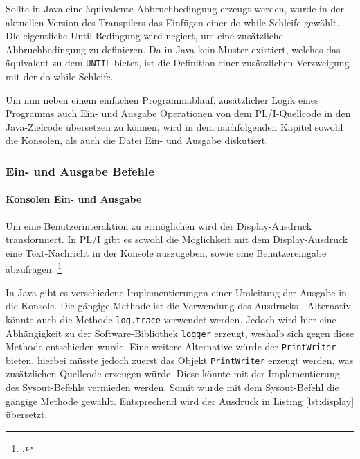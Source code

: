 Sollte in Java eine äquivalente Abbruchbedingung erzeugt werden, wurde in der aktuellen Version des Transpilers das Einfügen einer do-while-Schleife gewählt. Die eigentliche Until-Bedingung wird negiert, um eine zusätzliche Abbruchbedingung zu definieren. 
Da in Java kein Muster existiert, welches das äquivalent zu dem \verb+UNTIL+ bietet, ist die Definition einer zusätzlichen Verzweigung mit der do-while-Schleife.



Um nun neben einem einfachen Programmablauf, zusätzlicher Logik eines Programms auch Ein- und Ausgabe Operationen von dem PL/I-Quellcode in den Java-Zielcode übersetzen zu können, wird in dem nachfolgenden Kapitel sowohl die Konsolen, als auch die Datei Ein- und Ausgabe diskutiert.

\pagebreak
\subsubsection{Ein- und Ausgabe Befehle}
\paragraph{Konsolen Ein- und Ausgabe}
Um eine Benutzerinteraktion zu ermöglichen wird der Display-Ausdruck transformiert.
In PL/I gibt es sowohl die Möglichkeit mit dem Display-Ausdruck eine Text-Nachricht in der Konsole auszugeben, sowie eine Benutzereingabe abzufragen. \footcite[Vgl. ][S. 264ff.]{pliref}

In Java gibt es verschiedene Implementierungen einer Umleitung der Ausgabe in die Konsole.
Die gängige Methode ist die Verwendung des Ausdrucks . 
Alternativ könnte auch die Methode \verb+log.trace+ verwendet werden.
Jedoch wird hier eine Abhängigkeit zu der Software-Bibliothek \verb+logger+  erzeugt, weshalb sich gegen diese Methode entschieden wurde.
Eine weitere Alternative würde der \verb+PrintWriter+ bieten, hierbei müsste jedoch zuerst das Objekt \verb+PrintWriter+ erzeugt werden, was zusätzlichen Quellcode erzeugen würde. Diese könnte mit der Implementierung des Sysout-Befehls vermieden werden.
Somit wurde mit dem Sysout-Befehl die gängige Methode gewählt. Entsprechend wird der Ausdruck in Listing \ref{lst:display} übersetzt.

